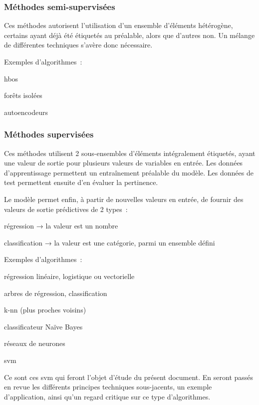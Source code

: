 \subsubsection{Méthodes semi-supervisées}

Ces méthodes autorisent l’utilisation d’un ensemble d’éléments hétérogène,
certains ayant déjà été étiquetés au préalable, alors que d’autres non.
Un mélange de différentes techniques s’avère donc nécessaire.

Exemples d’algorithmes :
\begin{itmz}
\item{\gls{hbos}}
\item{forêts isolées}
\item{autoencodeurs}
\end{itmz}

\subsubsection{Méthodes supervisées}

Ces méthodes utilisent 2 sous-ensembles d’éléments intégralement étiquetés,
ayant une valeur de sortie pour plusieurs valeurs de variables en entrée.
Les données d’apprentissage permettent un entraînement préalable du modèle.
Les données de test permettent ensuite d’en évaluer la pertinence.

Le modèle permet enfin, à partir de nouvelles valeurs en entrée,
de fournir des valeurs de sortie prédictives de 2 types :
\begin{itmz}
\item{régression → la valeur est un nombre}
\item{classification → la valeur est une catégorie, parmi un ensemble défini}
\end{itmz}

Exemples d’algorithmes :
\begin{itmz}
\item{régression linéaire, logistique ou vectorielle}
\item{arbres de régression, classification}
\item{k-\gls{nn} (plus proches voisins)}
\item{classificateur Naïve Bayes}
\item{réseaux de neurones}
\item{\gls{svm}}
\end{itmz}

Ce sont ces \gls{svm} qui feront l’objet d’étude du présent document.
En seront passés en revue les différents principes techniques sous-jacents,
un exemple d’application, ainsi qu’un regard critique sur ce type d’algorithmes.

\pagebreak
